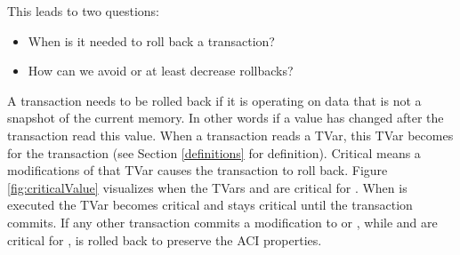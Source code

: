This leads to two questions:
\begin{itemize}
 \item When is it needed to roll back a transaction?
 \item How can we avoid or at least decrease rollbacks?
\end{itemize}
A transaction needs to be rolled back if it is operating on data that is not a snapshot of the current memory. In other words 
if a value has changed after the transaction read this value. When a transaction reads a TVar, this TVar becomes 
 for the transaction (see Section \ref{definitions} for definition). Critical means a modifications of that TVar causes the transaction to roll back.
Figure \ref{fig:criticalValue} visualizes when the TVars  and  are critical for .
When  is executed the TVar becomes critical and stays critical until the transaction commits.
If any other transaction commits a modification to  or , while  and  are
critical for ,  is rolled back to preserve the ACI properties. 

